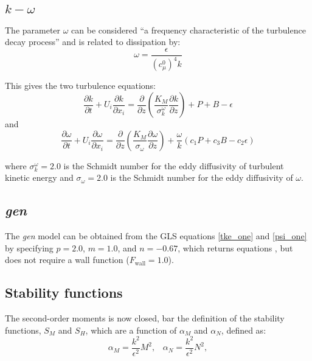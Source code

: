 \subsection{$k-\omega$}
The parameter $\omega$ can be considered ``a frequency characteristic of the turbulence decay process'' and is related to dissipation by:
\begin{equation}
\omega = \frac{\epsilon}{{\left(c_\mu^0\right)}^4k}
\end{equation}

This gives the two turbulence equations:
\begin{equation}
\frac{\partial k}{\partial t} + U_i\frac{\partial k}{\partial x_i} = \frac{\partial}{\partial z}\left(\frac{K_M}{\sigma_k^\omega}\frac{\partial k}{\partial z}\right) + P + B - \epsilon
\end{equation}
and
\begin{equation}
\frac{\partial\omega}{\partial t} + U_i\frac{\partial\omega}{\partial x_i} = \frac{\partial}{\partial z}\left(\frac{K_M}{\sigma_\omega}\frac{\partial\omega}{\partial z}\right) + \frac{\omega}{k}(c_1P + c_3B - c_2\epsilon)
\end{equation}

where $\sigma_k^\omega=2.0$ is the Schmidt number for the eddy diffusivity of turbulent kinetic energy and $\sigma_\omega=2.0$ is the Schmidt number for the eddy diffusivity of $\omega$.

\subsection{\emph{gen}}

The \emph{gen} model can be obtained from the GLS equations \eqref{tke_one} and \eqref{psi_one} by specifying $p=2.0$, $m=1.0$, and $n=-0.67$, which returns equations , but does not require a wall function ($F_{\mathrm{wall}}=1.0$).

\subsection{Stability functions}

The second-order moments is now closed, bar the definition of the stability functions, $S_M$ and $S_H$, 
which are a function of $\alpha_M$ and $\alpha_N$, defined as:
\begin{equation*}
\alpha_M=\frac{k^2}{\epsilon^2}M^2, \;\;\;
\alpha_N=\frac{k^2}{\epsilon^2}N^2,
\end{equation*}

